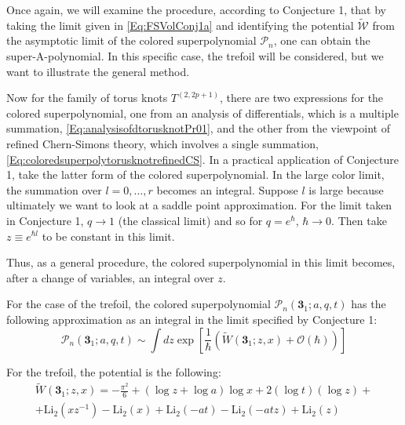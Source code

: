 \documentclass[a4paper,titlepage,twoside]{book}
\begin{document}
Once again, we will examine the procedure, according to Conjecture 1, that by taking the limit given in \eqref{Eq:FSVolConj1a} and identifying the potential $\widetilde{\mathcal{W}}$ from the asymptotic limit of the colored superpolynomial $\mathcal{P}_n$, one can obtain the super-A-polynomial.  In this specific case, the trefoil will be considered, but we want to illustrate the general method.  

Now for the family of torus knots $T^{(2,2p+1)}$, there are two expressions for the colored superpolynomial, one from an analysis of differentials, which is a multiple summation, \eqref{Eq:analysisofdtorusknotPr01}, and the other from the viewpoint of refined Chern-Simons theory, which involves a single summation, \eqref{Eq:coloredsuperpolytorusknotrefinedCS}.  In a practical application of Conjecture 1, take the latter form of the colored superpolynomial.  In the large color limit, the summation over $l=0, \dots , r$ becomes an integral.  Suppose $l$ is large because ultimately we want to look at a saddle point approximation.  For the limit taken in Conjecture 1, $q\to 1$ (the classical limit) and so for $q=e^{\hbar}$, $\hbar \to 0$.  Then take $z\equiv e^{\hbar l}$ to be constant in this limit.  

Thus, as a general procedure, the colored superpolynomial in this limit becomes, after a change of variables, an integral over $z$.  

For the case of the trefoil, the colored superpolynomial $\mathcal{P}_n{ (\mathbf{3}_1;a,q,t)}$ has the following approximation as an integral in the limit specified by Conjecture 1:
\begin{equation}
\mathcal{P}_n{ (\mathbf{3}_1;a,q,t) } \sim \int dz \exp{ \left[ \frac{1}{ \hbar} \left( \widetilde{W}{ (\mathbf{3}_1;z,x)  + \mathcal{O}{ ( \hbar) } } \right) \right] }
\end{equation}

For the trefoil, the potential is the following:
\begin{equation}
  \begin{gathered}
    \widetilde{W}{ (\mathbf{3}_1;z,x) } = - \frac{ \pi^2}{ 6} + \left( \log{z} + \log{a} \right) \log{x} + 2(\log{t} )( \log{z}) + \\
    + \text{Li}_2{ (xz^{-1}) } - \text{Li}_2{(x)} + \text{Li}_2{ (-at) } - \text{Li}_2{ (-atz) } +\text{Li}_2{(z)}
\end{gathered}
\end{equation}
\end{document}
